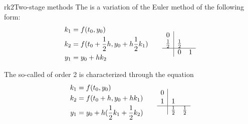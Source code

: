 \begin{Example*}{rk2}{Two-stage methods}
   The  is
  a variation of the Euler method of the following form:
  \begin{gather*}
    \begin{aligned}
      k_1 & = f(t_0,y_0) \\
      k_2 & = f(t_0 + \frac12 h, y_0 + h \frac12 k_1) \\
      y_{1} & = y_0 + h k_2
    \end{aligned}
    \qquad
    \begin{array}{c|cc}
      0 & \\
      \frac12 & \frac12 \\
      \hline
        & 0 & 1
    \end{array}
  \end{gather*}

  The so-called  of order 2 is characterized
  through the equation
  \begin{gather*}
    \begin{aligned}
      k_1 & = f(t_0, y_0) \\
      k_2 & = f(t_0 + h, y_0 + h k_1) \\
      y_{1} & = y_0 + h ( \frac12 k_1 + \frac12 k_2 ) \\
    \end{aligned}
    \qquad
    \begin{array}{c|cc}
      0 & \\
      1 & 1 \\
      \hline
        & \frac12 & \frac12 \\
    \end{array}
  \end{gather*}
\end{Example*}

